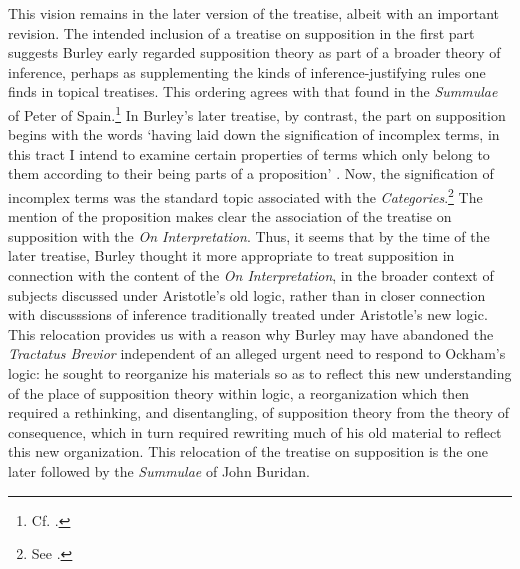 \documentclass[]{article}
\begin{document}
This vision remains in the later version of the treatise, albeit with an important revision. The intended inclusion of a treatise on supposition in the first part suggests Burley early regarded supposition theory as part of a broader theory of inference, perhaps as supplementing the kinds of inference-justifying rules one finds in topical treatises. This ordering agrees with that found in the \textit{Summulae} of Peter of Spain.\footnote{Cf. \cite{Klima2003a}.} In Burley's later treatise, by contrast, the part on supposition begins with the words `having laid down the signification of incomplex terms, in this tract I intend to examine certain properties of terms which only belong to them according to their being parts of a proposition' \cite[p. 1.3-6]{BurleyDPAL}. Now, the signification of incomplex terms was the standard topic associated with the \textit{Categories}.\footnote{See \cite[p. 65]{Burley2003}.} The mention of the proposition makes clear the association of the treatise on supposition with the \textit{On Interpretation}. Thus, it seems that by the time of the later treatise, Burley thought it more appropriate to treat supposition in connection with the content of the \textit{On Interpretation}, in the broader context of subjects discussed under Aristotle's old logic, rather than in closer connection with discusssions of inference traditionally treated under Aristotle's new logic. This relocation provides us with a reason why Burley may have abandoned the \textit{Tractatus Brevior} independent of an alleged urgent need to respond to Ockham's logic: he sought to reorganize his materials so as to reflect this new understanding of the place of supposition theory within logic, a reorganization which then required a rethinking, and disentangling, of supposition theory from the theory of consequence, which in turn required rewriting much of his old material to reflect this new organization. This relocation of the treatise on supposition is the one later followed by the \textit{Summulae} of John Buridan.
\end{document}
